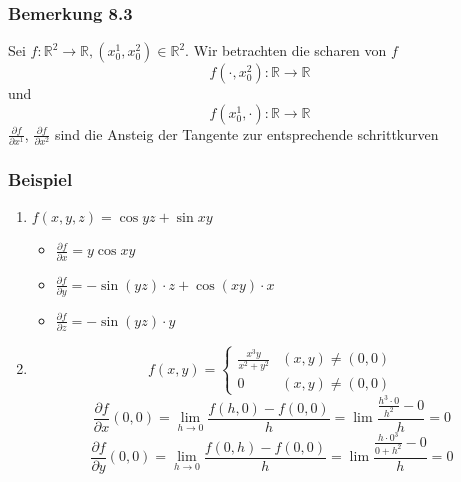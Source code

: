 \subsubsection*{Bemerkung 8.3}
Sei $f:\mathbb{R}^2\rightarrow\mathbb{R}, \left(x_0^1,x_0^2\right)\in\mathbb{R}^2$. Wir betrachten die scharen von $f$ $$f(\cdot ,x_0^2):\mathbb{R}\rightarrow \mathbb{R}$$ und $$f(x_0^1,\cdot ):\mathbb{R}\rightarrow\mathbb{R}$$ $\frac{\partial f}{\partial x^1}$, $\frac{\partial f}{\partial x^2}$ sind die Ansteig der Tangente zur entsprechende schrittkurven

\subsubsection*{Beispiel}
\begin{enumerate}
\item $f(x,y,z)=\cos yz+\sin xy$
\begin{itemize}
\item $\frac{\partial f}{\partial x}=y\cos xy$
\item $\frac{\partial f}{\partial y}=-\sin(yz)\cdot z+\cos(xy)\cdot x$
\item $\frac{\partial f}{\partial z}=-\sin(yz)\cdot y$
\end{itemize}
\item \[f(x,y) = \left\{ {\begin{array}{*{20}{c}}
{\frac{{{x^3}y}}{{{x^2} + {y^2}}}}&{(x,y)\not  = (0,0)}\\
0&{(x,y)\not  = (0,0)}
\end{array}} \right.\]
$$\frac{{\partial f}}{{\partial x}}(0,0) = \mathop {\lim }\limits_{h \to 0} \frac{{f(h,0) - f(0,0)}}{h} = \lim \frac{{\frac{{{h^3} \cdot 0}}{{{h^2}}} - 0}}{h} = 0$$
\[\frac{{\partial f}}{{\partial y}}(0,0) = \mathop {\lim }\limits_{h \to 0} \frac{{f(0,h) - f(0,0)}}{h} = \lim \frac{{\frac{{h \cdot {0^3}}}{{0 + {h^2}}} - 0}}{h} = 0\]
\end{enumerate}
